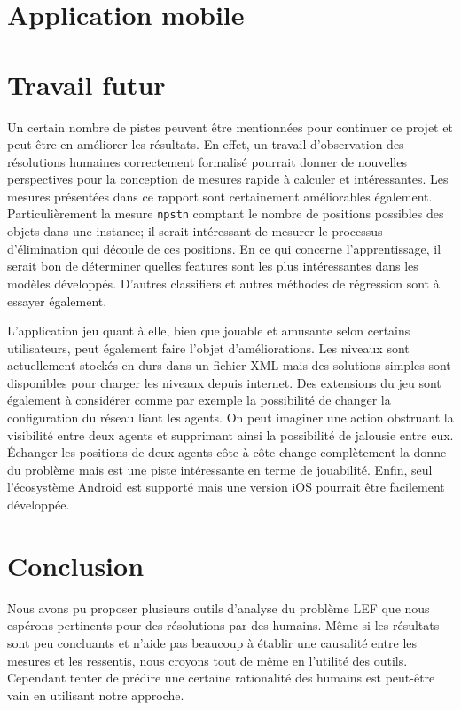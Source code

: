 \documentclass[a4paper, 11pt, titlepage]{article}
\begin{document}
	\section{Application mobile}
	    \label{app}
	    
	    
	\section{Travail futur}
    Un certain nombre de pistes peuvent être mentionnées pour continuer ce projet et peut être en améliorer les résultats. En effet, un travail d'observation des résolutions humaines correctement formalisé pourrait donner de nouvelles perspectives pour la conception de mesures rapide à calculer et intéressantes. Les mesures présentées dans ce rapport sont certainement améliorables également. Particulièrement la mesure \texttt{npstn} comptant le nombre de positions possibles des objets dans une instance; il serait intéressant de mesurer le processus d'élimination qui découle de ces positions. En ce qui concerne l'apprentissage, il serait bon de déterminer quelles features sont les plus intéressantes dans les modèles développés. D'autres classifiers et autres méthodes de régression sont à essayer également.
    
	L'application jeu quant à elle, bien que jouable et amusante selon certains utilisateurs, peut également faire l'objet d'améliorations. Les niveaux sont actuellement stockés en durs dans un fichier XML mais des solutions simples sont disponibles pour charger les niveaux depuis internet. Des extensions du jeu sont également à considérer comme par exemple la possibilité de changer la configuration du réseau liant les agents. On peut imaginer une action obstruant la visibilité entre deux agents et supprimant ainsi la possibilité de jalousie entre eux. Échanger les positions de deux agents côte à côte change complètement la donne du problème mais est une piste intéressante en terme de jouabilité. Enfin, seul l'écosystème Android est supporté mais une version iOS pourrait être facilement développée.
	
	\section{Conclusion}
	
	Nous avons pu proposer plusieurs outils d'analyse du problème LEF que nous espérons pertinents pour des résolutions  par des humains. Même si les résultats sont peu concluants et n'aide pas beaucoup à établir une causalité entre les mesures et les ressentis, nous croyons tout de même en l'utilité des outils. Cependant tenter de prédire une certaine rationalité des humains est peut-être vain en utilisant notre approche.
	
\end{document}
